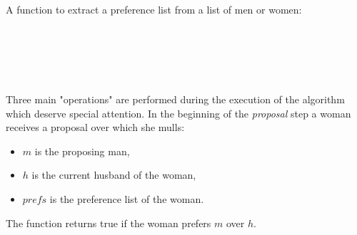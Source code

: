 {A function to extract a preference list from a list of men or women:

\begin{code}%
\>[0]\AgdaSpace{}%
\AgdaSymbol{:}\AgdaSpace{}%
\AgdaSpace{}%
\AgdaSpace{}%
\AgdaSpace{}%
\AgdaSymbol{(}\AgdaSpace{}%
\AgdaSpace{}%
\AgdaSpace{}%
\AgdaSymbol{)}\AgdaSpace{}%
\AgdaSpace{}%
\AgdaSpace{}%
\<%
\\
\>[0]\AgdaSpace{}%
\AgdaSpace{}%
\AgdaInductiveConstructor{[]}\AgdaSpace{}%
\AgdaSymbol{=}\AgdaSpace{}%
\AgdaInductiveConstructor{[]}\<%
\\
\>[0]\AgdaSpace{}%
\AgdaSpace{}%
\AgdaSymbol{((}\AgdaSpace{}%
\AgdaOperator{\AgdaInductiveConstructor{,}}\AgdaSpace{}%
\AgdaSymbol{)}\AgdaSpace{}%
\AgdaSpace{}%
\AgdaSymbol{)}\AgdaSpace{}%
\AgdaSpace{}%
\AgdaSpace{}%
\AgdaSpace{}%
\<%
\\
\>[0]\AgdaSpace{}%
\AgdaSymbol{|}\AgdaSpace{}%
\AgdaSpace{}%
\AgdaSymbol{\AgdaUnderscore{}}\AgdaSpace{}%
\AgdaSymbol{=}\AgdaSpace{}%
\<%
\\
\>[0]\AgdaSpace{}%
\AgdaSymbol{|}\AgdaSpace{}%
\AgdaSymbol{\AgdaUnderscore{}}%
\>[14]\AgdaSymbol{=}\AgdaSpace{}%
\AgdaSpace{}%
\AgdaSpace{}%
\<%
\end{code}

Three main "operations" are performed during the execution of the algorithm which deserve special attention. In the beginning of the \emph{proposal} step a woman receives a proposal over which she mulls:
\begin{itemize}
  \item $m$ is the proposing man,
  \item $h$ is the current husband of the woman,
  \item $prefs$ is the preference list of the woman.
\end{itemize}
The function returns true if the woman prefers $m$ over $h$.

}
